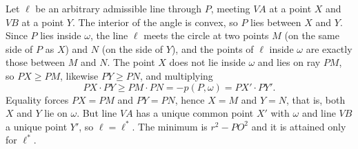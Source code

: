 {    Let $\ell$ be an arbitrary admissible line through $P$, meeting $VA$ at a point $X$ and $VB$ at a point $Y$. The interior of the angle is convex, so $P$ lies between $X$ and $Y$. Since $P$ lies inside $\omega$, the line $\ell$ meets the circle at two points $M$ (on the same side of $P$ as $X$) and $N$ (on the side of $Y$), and the points of $\ell$ inside $\omega$ are exactly those between $M$ and $N$. The point $X$ does not lie inside $\omega$ and lies on ray $PM$, so $PX \ge PM$, likewise $PY \ge PN$, and multiplying
    $$
    PX \cdot PY \ge PM \cdot PN = -p(P,\omega) = PX' \cdot PY'.
    $$
    Equality forces $PX = PM$ and $PY = PN$, hence $X = M$ and $Y = N$, that is, both $X$ and $Y$ lie on $\omega$. But line $VA$ has a unique common point $X'$ with $\omega$ and line $VB$ a unique point $Y'$, so $\ell = \ell^*$. The minimum is $r^2 - PO^2$ and it is attained only for $\ell^*$.
}

